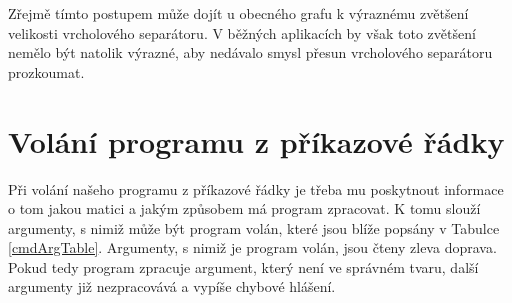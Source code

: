 \documentclass[11pt,american,czech,oneside]{book}
\theoremstyle{plain}
\theoremstyle{definition}
\begin{document}
Zřejmě tímto postupem může dojít u obecného grafu k výraznému zvětšení velikosti vrcholového separátoru. V běžných aplikacích by však toto zvětšení nemělo být natolik výrazné, aby nedávalo smysl přesun vrcholového separátoru prozkoumat.


\section{Volání programu z příkazové řádky}

Při volání našeho programu z příkazové řádky je třeba mu poskytnout informace o tom jakou matici a jakým způsobem má program zpracovat. K tomu slouží argumenty, s nimiž může být program volán, které jsou blíže popsány v Tabulce \ref{cmdArgTable}. Argumenty, s nimiž je program volán, jsou čteny zleva doprava. Pokud tedy program zpracuje argument, který není ve správném tvaru, další argumenty již nezpracovává a vypíše chybové hlášení.
\end{document}
